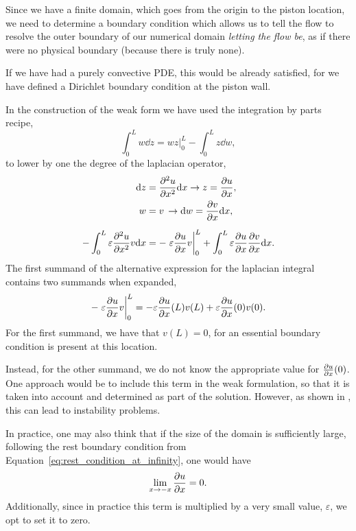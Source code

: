 \documentclass[../../thesis.tex]{subfiles}
\begin{document}
Since we have a finite domain, which goes from the origin to the piston location,
we need to determine a boundary condition which allows us 
to tell the flow to resolve the outer boundary of our numerical domain
\textit{letting the flow be}, 
as if there were no physical boundary (because there is truly none).

If we have had a purely convective PDE, this would be already satisfied, 
for we have defined a Dirichlet boundary condition at the piston wall.

In the construction of the weak form
we have used the integration by parts recipe,
\begin{equation}
    \int_{0}^{L} w \dd z 
    = \left.wz\right|_{0}^{L} - \int_{0}^{L} z \dd w,
\end{equation}
to lower by one the degree of the laplacian operator,
\begin{subequations}
    \begin{align}
        \dd z &= \pdv[2]{u}{x} \dd x \rightarrow z = \pdv{u}{x},
        \\
        w &= v \, \rightarrow \dd w = \pdv{v}{x} \dd x,
        \\[2mm]
        -\int_{0}^{L} 
        \varepsilon \pdv[2]{u}{x} v \dd x 
        &= -\left.\varepsilon \pdv{u}{x} v \right|_{0}^{L} 
        + \int_{0}^{L} \varepsilon \pdv{u}{x} \pdv{v}{x} \dd x.
    \end{align}
\end{subequations}
The first summand of the alternative expression for the laplacian integral 
contains two summands when expanded,
\begin{equation}
    -\left.\varepsilon \pdv{u}{x} v \right|_{0}^{L}
    = 
    -\varepsilon\pdv{u}{x} \qty(L) v(L) 
    +\varepsilon\pdv{u}{x} \qty(0) v(0).
\end{equation}
For the first summand, we have that $v(L) = 0$, 
for an essential boundary condition is present at this location.

Instead, for the other summand, we do not know the appropriate value for 
$\pdv{u}{x} \qty(0)$.
One approach would be to include this term in the weak formulation, so that it is taken into account and determined as part of the solution.
However, as shown in \cite{outerBoundary}, this can lead to instability problems.

In practice, one may also think that if the size of the domain is sufficiently large,
following the rest boundary condition from Equation~\eqref{eq:rest_condition_at_infinity},
one would have
\begin{equation}
    \lim_{x\rightarrow -x} \pdv{u}{x} = 0.
\end{equation}
Additionally, since in practice this term is multiplied by a very small value, 
$\varepsilon$, 
we opt to set it to zero.
\end{document}
